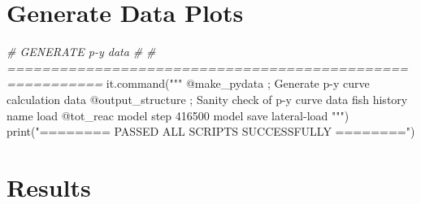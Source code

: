 \documentclass[a4paper, nobind]{templates/ociamthesis}
\newenvironment{Shaded}{\begin{snugshade}}{\end{snugshade}}
\newcommand{\BuiltInTok}[1]{#1}
\newcommand{\CommentTok}[1]{\textcolor[rgb]{0.56,0.35,0.01}{\textit{#1}}}
\newcommand{\NormalTok}[1]{#1}
\newcommand{\StringTok}[1]{\textcolor[rgb]{0.31,0.60,0.02}{#1}}
\renewenvironment{Shaded}
{
  \vspace{10pt}%
  \begin{snugshade}%
}{%
  \end{snugshade}%
  \vspace{8pt}%
}
\begin{document}
\hypertarget{generate-data-plots}{%
\section{Generate Data Plots}\label{generate-data-plots}}

\begin{Shaded}
\begin{Highlighting}[]
\CommentTok{\# GENERATE p{-}y data \#}
\CommentTok{\# =========================================================}
\NormalTok{it.command(}\StringTok{"""}
\StringTok{@make\_pydata        ; Generate p{-}y curve calculation data}
\StringTok{@output\_structure   ; Sanity check of p{-}y curve data}
\StringTok{fish history name \textquotesingle{}load\textquotesingle{} @tot\_reac}
\StringTok{model step 416500}
\StringTok{model save \textquotesingle{}lateral{-}load\textquotesingle{}}
\StringTok{"""}\NormalTok{)}
\BuiltInTok{print}\NormalTok{(}\StringTok{"======== PASSED ALL SCRIPTS SUCCESSFULLY ========"}\NormalTok{)}
\end{Highlighting}
\end{Shaded}

\hypertarget{results}{%
\section{Results}\label{results}}
\end{document}
